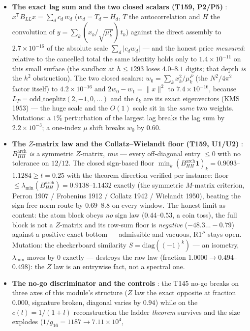 \documentclass[11pt,a4paper]{article}
\begin{document}
\begin{itemize}[leftmargin=1.5em]
even \emph{defined} for it.
\item \textbf{The exact lag sum and the two closed scalars (T159, P2/P5)} \mE:
$x^{\mathsf T}B_{LL}x=\sum_d c_d\,w_d$ ($w_d=T_d-H_d$, $T$ the autocorrelation and $H$ the
convolution of $y=\sum_k(x_k/\sqrt{\mu^P_k})\,t_k$) against the direct assembly to
$2.7\times10^{-16}$ of the absolute scale $\sum_d|c_d w_d|$ --- and the honest price
\emph{measured}: relative to the cancelled total the same identity holds only to
$1.4\times10^{-11}$ on this small surface (the sandbox at $h\le1293$ loses $4.0$--$8.1$
digits; that depth \emph{is} the $h^2$ obstruction). The two closed scalars:
$w_0=\sum_kx_k^2/\mu^P_k$ (the $N^2/4\pi^2$ factor itself) to $4.2\times10^{-16}$ and
$2w_0-w_1=\|x\|^2$ to $7.4\times10^{-16}$, because $L_P=\mathrm{odd\_toeplitz}(2,-1,0,\ldots)$
and the $t_k$ are its exact eigenvectors (KMS 1953) --- the huge scale and the $O(1)$
scale sit in the \emph{same} two weights. Mutations: a $1\%$ perturbation of the largest
lag breaks the lag sum by $2.2\times10^{-3}$; a one-index $\mu$ shift breaks $w_0$ by
$0.60$.
\item \textbf{The $Z$-matrix law and the Collatz--Wielandt floor (T159, U1/U2)} \mE:
$B^{\mathrm{arch}}_{HH}$ \emph{is} a symmetric $Z$-matrix, \emph{raw} --- every
off-diagonal entry $\le0$ with no tolerance on $12/12$. The closed sign-based floor
$\min_k(B^{\mathrm{arch}}_{HH}\mathbf 1)_k=0.9093$--$1.1284\ge t=0.25$ with the theorem
direction verified per instance: floor $\le\lambda_{\min}(B^{\mathrm{arch}}_{HH})
=0.9138$--$1.1432$ exactly (the symmetric $M$-matrix criterion, Perron 1907 / Frobenius
1912 / Collatz 1942 / Wielandt 1950), beating the sign-free norm route by $0.69$--$8.8$ on
every window. The honest limit as content: the atom block obeys \emph{no} sign law
($0.44$--$0.53$, a coin toss), the full block is not a $Z$-matrix and its row-sum floor is
\emph{negative} ($-48.3\ldots-0.79$) against a positive exact bottom --- admissible and
vacuous, R1$''$ stays open. Mutation: the checkerboard similarity $S=\mathrm{diag}((-1)^k)$
--- an isometry, $\lambda_{\min}$ moves by $0$ exactly --- destroys the raw law (fraction
$1.0000\to0.494$--$0.498$): the $Z$ law is an entrywise fact, not a spectral one.
\item \textbf{The no-go discriminator and the controls} \mE: the T145 no-go breaks on
three axes of this module's structure ($Z$ law the exact opposite at fraction $0.000$,
signature broken, diagonal varies by $0.94$) while on the $c(l)=1/(1+l)$ reconstruction
the ladder \emph{theorem} survives and the size explodes ($1/g_{16}=1187\to7.11\times10^{4}$,

\end{itemize}
\end{document}
